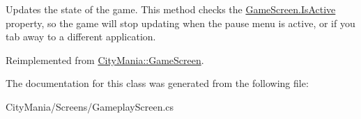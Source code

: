Updates the state of the game. This method checks the \hyperlink{classCityMania_1_1GameScreen_a50204f4b2c99f890598285395bfeda02}{GameScreen.IsActive} property, so the game will stop updating when the pause menu is active, or if you tab away to a different application. 

Reimplemented from \hyperlink{classCityMania_1_1GameScreen_a7f0d5b33eca521dc7fcd89eec337ccf9}{CityMania::GameScreen}.

The documentation for this class was generated from the following file:\begin{DoxyCompactItemize}
\item 
CityMania/Screens/GameplayScreen.cs\end{DoxyCompactItemize}
